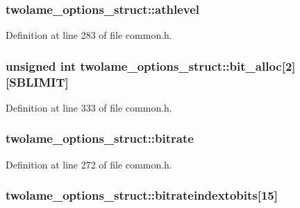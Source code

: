 \subsubsection[{\texorpdfstring{athlevel}{athlevel}}]{ twolame\+\_\+options\+\_\+struct\+::athlevel}\hypertarget{structtwolame__options__struct_a05b515c7abc705511f7bde9e7838dfac}{}\label{structtwolame__options__struct_a05b515c7abc705511f7bde9e7838dfac}


Definition at line 283 of file common.\+h.

\subsubsection[{\texorpdfstring{bit\+\_\+alloc}{bit_alloc}}]{\setlength{\rightskip}{0pt plus 5cm}unsigned {\bf int} twolame\+\_\+options\+\_\+struct\+::bit\+\_\+alloc\mbox{[}2\mbox{]}\mbox{[}{\bf S\+B\+L\+I\+M\+IT}\mbox{]}}\hypertarget{structtwolame__options__struct_a8eaa31d1aa907911c5ebf55a4e654ba8}{}\label{structtwolame__options__struct_a8eaa31d1aa907911c5ebf55a4e654ba8}


Definition at line 333 of file common.\+h.

\subsubsection[{\texorpdfstring{bitrate}{bitrate}}]{ twolame\+\_\+options\+\_\+struct\+::bitrate}\hypertarget{structtwolame__options__struct_ac471f69e776fa200a2032a88dfdee3b0}{}\label{structtwolame__options__struct_ac471f69e776fa200a2032a88dfdee3b0}


Definition at line 272 of file common.\+h.

\subsubsection[{\texorpdfstring{bitrateindextobits}{bitrateindextobits}}]{ twolame\+\_\+options\+\_\+struct\+::bitrateindextobits\mbox{[}15\mbox{]}}\hypertarget{structtwolame__options__struct_abe83209635e3e6647695d14da1a1c5d0}{}\label{structtwolame__options__struct_abe83209635e3e6647695d14da1a1c5d0}


